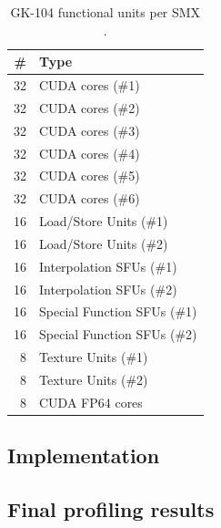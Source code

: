 \documentclass[11pt, oneside, a4paper]{article}
\begin{document}
\begin{table}[tb]
	\caption{GK-104 functional units per SMX \cite{Anand}.}
	\label{tab:funcunits}
	\begin{center}
		\begin{tabular}{rl}
		\hline

		\hline
		\textbf{\#} & \textbf{Type} \\
		\hline
			32 & CUDA cores (\#1) \\
			32 & CUDA cores (\#2) \\
			32 & CUDA cores (\#3) \\
			32 & CUDA cores (\#4) \\
			32 & CUDA cores (\#5) \\
			32 & CUDA cores (\#6) \\
			16 & Load/Store Units (\#1) \\
			16 & Load/Store Units (\#2) \\
			16 & Interpolation SFUs (\#1) \\
			16 & Interpolation SFUs (\#2) \\
			16 & Special Function SFUs (\#1) \\
			16 & Special Function SFUs (\#2) \\
			8 & Texture Units (\#1) \\
			8 & Texture Units (\#2) \\
			8 & CUDA FP64 cores \\
		\hline

		\hline
		\end{tabular}
	\end{center}
\end{table}


\subsection{Implementation} %
\label{sub:implementation}




\subsection{Final profiling results} %
\label{sub:final_profiling_results}
\end{document}
